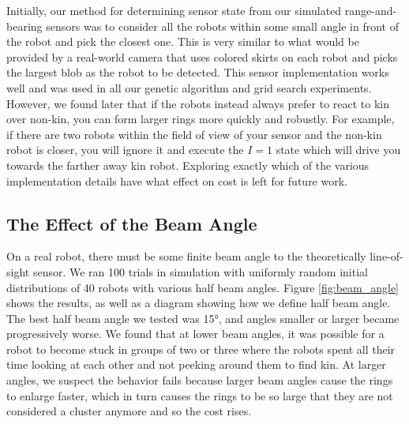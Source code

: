 \documentclass[conference]{IEEEtran}
\begin{document}
    Initially, our method for determining sensor state from our simulated range-and-bearing sensors was to consider all the robots within some small angle in front of the robot and pick the closest one. This is very similar to what would be provided by a real-world camera that uses colored skirts on each robot and picks the largest blob as the robot to be detected. This sensor implementation works well and was used in all our genetic algorithm and grid search experiments. However, we found later that if the robots instead always prefer to react to kin over non-kin, you can form larger rings more quickly and robustly. For example, if there are two robots within the field of view of your sensor and the non-kin robot is closer, you will ignore it and execute the $I=1$ state which will drive you towards the farther away kin robot. Exploring exactly which of the various implementation details have what effect on cost is left for future work.

  \subsection{The Effect of the Beam Angle} \label{section:beam_angle}

    On a real robot, there must be some finite beam angle to the theoretically line-of-sight sensor. We ran 100 trials in simulation with uniformly random initial distributions of 40 robots with various half beam angles. Figure \ref{fig:beam_angle} shows the results, as well as a diagram showing how we define half beam angle. The best half beam angle we tested was \ang{15}, and angles smaller or larger became progressively worse. We found that at lower beam angles, it was possible for a robot to become stuck in groups of two or three where the robots spent all their time looking at each other and not peeking around them to find kin. At larger angles, we suspect the behavior fails because larger beam angles cause the rings to enlarge faster, which in turn causes the rings to be so large that they are not considered a cluster anymore and so the cost rises.
\end{document}
